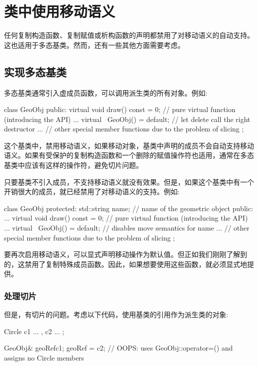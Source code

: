 \section{类中使用移动语义}
任何复制构造函数、复制赋值或析构函数的声明都禁用了对移动语义的自动支持。这也适用于多态基类。然而，还有一些其他方面需要考虑。

\subsection{实现多态基类}

多态基类通常引入虚成员函数，可以调用派生类的所有对象。例如:

\begin{cppcode}
class GeoObj {
	public:
	virtual void draw() const = 0; // pure virtual function (introducing the API)
	...
	virtual ~GeoObj() = default; // let delete call the right destructor
	... // other special member functions due to the problem of slicing
};
\end{cppcode}

这个基类中，禁用移动语义，如果移动对象，基类中声明的成员不会自动支持移动语义。如果有受保护的复制构造函数和一个删除的赋值操作符也适用，通常在多态基类中应该有这样的操作符，避免切片问题。

只要基类不引入成员，不支持移动语义就没有效果。但是，如果这个基类中有一个开销很大的成员，就已经禁用了对移动语义的支持。例如:

\begin{cppcode}
class GeoObj {
protected:
	std::string name; // name of the geometric object
public:
	...
	virtual void draw() const = 0; // pure virtual function (introducing the API)
	...
	virtual ~GeoObj() = default; // disables move semantics for name
	... // other special member functions due to the problem of slicing
};
\end{cppcode}

要再次启用移动语义，可以显式声明移动操作为默认值。但正如我们刚刚了解到的，这禁用了复制特殊成员函数。因此，如果想要使用这些函数，就必须显式地提供。

\subsubsection{处理切片}

但是，有切片的问题。考虑以下代码，使用基类的引用作为派生类的对象:

\begin{cppcode}
Circle c1{ ... }, c2{ ... };

GeoObj& geoRef{c1};
geoRef = c2; // OOPS: uses GeoObj::operator=() and assigns no Circle members
\end{cppcode}

